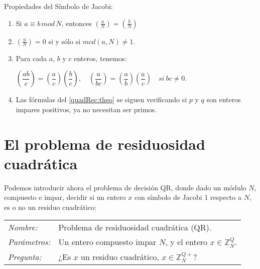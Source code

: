 \begin{theorem}
	Propiedades del Símbolo de Jacobi:
	
	\begin{enumerate}[label=(\roman*)]
		\item Si $a \equiv b \, mod \, N$, entonces $\left( \frac{a}{N} \right) = \left( \frac{b}{N} \right)$
		
		\item 	$\left( \frac{a}{N} \right) = 0$ si y sólo si $mcd(a, N) \neq 1$.
		\item Para cada $a$, $b$ y $c$ enteros, tenemos: \\
		
		\begin{center}
			$
			\left( \dfrac{ab}{c} \right) = \left( \dfrac{a}{c} \right) \left( \dfrac{b}{c} \right), \quad \left( \dfrac{a}{bc} \right) = \left( \dfrac{a}{b} \right) \left( \dfrac{a}{c} \right) \quad si\ bc \neq 0
			$.
		\end{center}
		
		
		
		\item Las fórmulas del \autoref{quadRec:theo} se siguen verificando si $p$ y $q$ son enteros impares positivos, ya no necesitan ser primos.
		
	\end{enumerate}
\end{theorem}



\section{El problema de residuosidad cuadrática}

Podemos introducir ahora  el problema de decisión QR, donde dado un módulo $N$, compuesto e impar, decidir si un entero $x$ con símbolo de Jacobi $1$ respecto a $N$, es o no un residuo cuadrático:

\hfil

\begin{tabular}{|ll}
	\textit{Nombre:} & Problema de residuosidad cuadrática (QR). \\
	\textit{Parámetros:} & Un entero compuesto impar $N$, y el entero $x\in \mathbb{Z}^Q_N$. \\
	\textit{Pregunta:} & ¿Es $x$ un residuo cuadrático, $x \in \mathbb{Z}^{Q+}_N$? \\
\end{tabular}
\\

